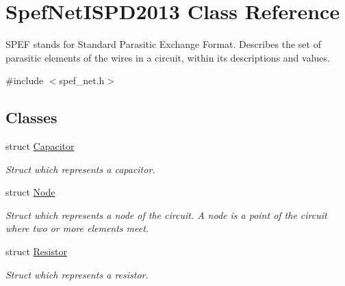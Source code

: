 \hypertarget{classSpefNetISPD2013}{\section{Spef\-Net\-I\-S\-P\-D2013 Class Reference}
\label{classSpefNetISPD2013}
}


S\-P\-E\-F stands for Standard Parasitic Exchange Format. Describes the set of parasitic elements of the wires in a circuit, within its descriptions and values.  




{\ttfamily \#include $<$spef\-\_\-net.\-h$>$}

\subsection*{Classes}
\begin{DoxyCompactItemize}
\item 
struct \hyperlink{structSpefNetISPD2013_1_1Capacitor}{Capacitor}
\begin{DoxyCompactList}\small\item\em Struct which represents a capacitor. \end{DoxyCompactList}\item 
struct \hyperlink{structSpefNetISPD2013_1_1Node}{Node}
\begin{DoxyCompactList}\small\item\em Struct which represents a node of the circuit. A node is a point of the circuit where two or more elements meet. \end{DoxyCompactList}\item 
struct \hyperlink{structSpefNetISPD2013_1_1Resistor}{Resistor}
\begin{DoxyCompactList}\small\item\em Struct which represents a resistor. \end{DoxyCompactList}\end{DoxyCompactItemize}

